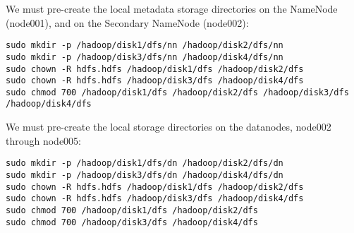 We must pre-create the local metadata storage directories on the NameNode
(node001), and on the Secondary NameNode (node002):

\begin{verbatim}
sudo mkdir -p /hadoop/disk1/dfs/nn /hadoop/disk2/dfs/nn
sudo mkdir -p /hadoop/disk3/dfs/nn /hadoop/disk4/dfs/nn
sudo chown -R hdfs.hdfs /hadoop/disk1/dfs /hadoop/disk2/dfs
sudo chown -R hdfs.hdfs /hadoop/disk3/dfs /hadoop/disk4/dfs
sudo chmod 700 /hadoop/disk1/dfs /hadoop/disk2/dfs /hadoop/disk3/dfs /hadoop/disk4/dfs
\end{verbatim}

We must pre-create the local storage directories on the datanodes, node002
through node005:

\begin{verbatim}
sudo mkdir -p /hadoop/disk1/dfs/dn /hadoop/disk2/dfs/dn
sudo mkdir -p /hadoop/disk3/dfs/dn /hadoop/disk4/dfs/dn
sudo chown -R hdfs.hdfs /hadoop/disk1/dfs /hadoop/disk2/dfs
sudo chown -R hdfs.hdfs /hadoop/disk3/dfs /hadoop/disk4/dfs
sudo chmod 700 /hadoop/disk1/dfs /hadoop/disk2/dfs
sudo chmod 700 /hadoop/disk3/dfs /hadoop/disk4/dfs
\end{verbatim}
